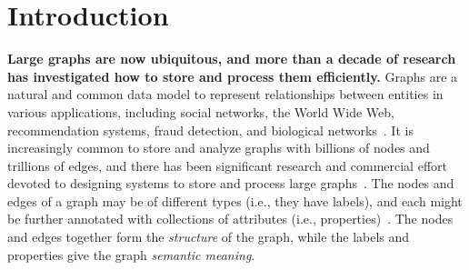 \section{Introduction}
\label{sec:intro}

\textbf{Large graphs are now ubiquitous, and more than a decade of research has investigated how to store and process them efficiently.}
Graphs are a natural and common data model to represent relationships between entities in various applications, including social networks, the World Wide Web, recommendation systems, fraud detection, and biological networks~\cite{ubiquityLargeGraphsVLDB2017}.
It is increasingly common to store and analyze graphs with billions of nodes and trillions of edges, and there has been significant research and commercial effort devoted to designing systems to store and process large graphs~\cite{ching2015oneTrillion,besta2020demystifying, lin2018shentu, gupta2024graphscale, zhou2025redtao}.
The nodes and edges of a graph may be of different types (i.e., they have labels), and each might be further annotated with collections of attributes (i.e., properties)~\cite{besta2020demystifying}.
The nodes and edges together form the \emph{structure} of the graph, while the labels and properties give the graph \emph{semantic meaning}.


